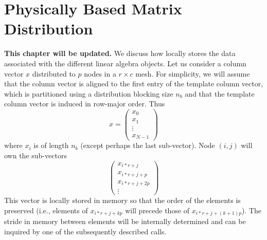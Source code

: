 \chapter{Physically Based Matrix Distribution}
\label{chapter:pbmd}


{\bf This chapter will be updated.}
We discuss how \plapack locally stores the data associated with the 
different linear algebra objects.
Let us consider a column vector $ x $ distributed to $p$ nodes in a 
$ r \times c $ mesh.  
For simplicity, we will assume that the column vector is
aligned to the first entry of the template column vector, which is
partitioned using a distribution blocking size $ n_b $ and that
the template column vector is induced in row-major order.
Thus
\[ x = \left( \begin{array}{c}
x_0 \\ \hline
x_1 \\ \hline
\vdots \\ \hline
x_{N-1}
\end{array}
\right)
\]
where $ x_i $ is of length $ n_b $ (except perhaps the last sub-vector).
Node $ (i,j) $ will own the sub-vectors
\[
\left( \begin{array}{c}
x_{i * r + j} \\ \hline
x_{i * r + j + p} \\ \hline
x_{i * r + j + 2p} \\ \hline
\vdots
\end{array}
\right)
\]
This vector is locally stored in memory so that the order of
the elements is preserved (i.e., elements of $ x_{i * r+j+kp} $
will precede those of $ x_{i* r+j+(k+1)p} $).
The stride in memory between elements will be internally determined and
can be inquired by one of the subsequently described calls.


